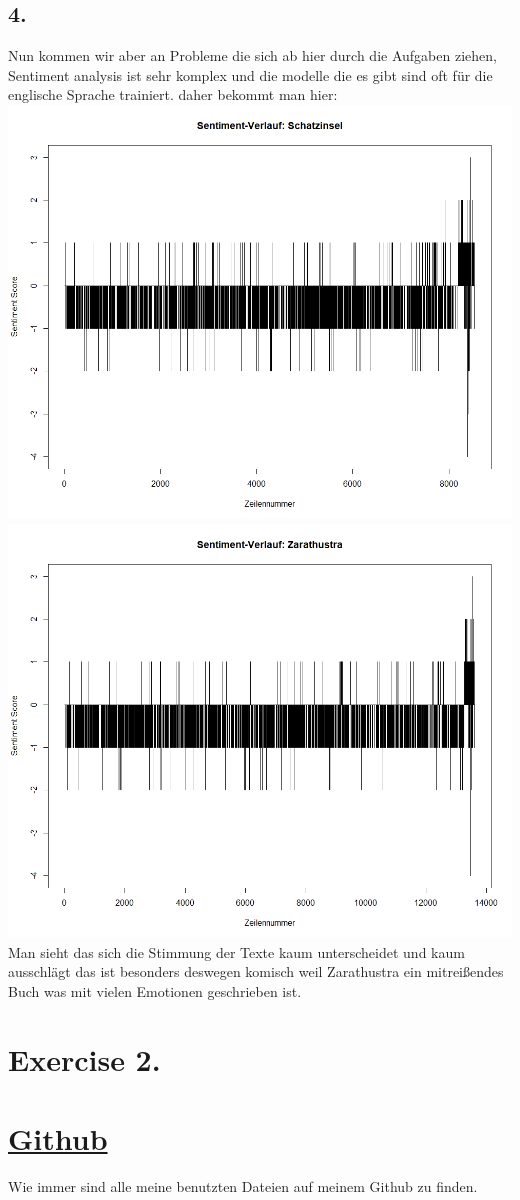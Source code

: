 \documentclass{scrartcl}
\begin{document}
\subsection*{4.}
Nun kommen wir aber an Probleme die sich ab hier durch die Aufgaben ziehen, Sentiment analysis ist sehr komplex und die modelle die es gibt sind oft für die englische Sprache trainiert. daher bekommt man hier:\\
\includegraphics*[scale=0.5]{SentimentSchatzinsel.png}\\
\includegraphics*[scale=0.5]{sentimentZarathustra.png}\\
Man sieht das sich die Stimmung der Texte kaum unterscheidet und kaum ausschlägt das ist besonders deswegen komisch weil Zarathustra ein mitreißendes Buch was mit vielen Emotionen geschrieben ist.


\section*{Exercise 2. }



\section*{\href{https://github.com/7hands/Angewandte-Modellierung-25-Colmant}{Github}}
Wie immer sind alle meine benutzten Dateien auf meinem Github zu finden. 
\end{document}

